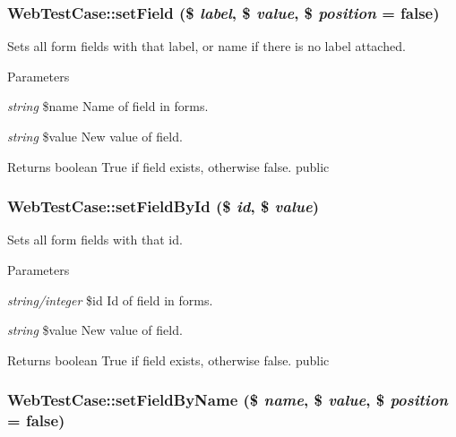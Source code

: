 \hypertarget{class_web_test_case_a2b8f21394a225f1386c22f671a6debc0}{
\subsubsection[{setField}]{\setlength{\rightskip}{0pt plus 5cm}WebTestCase::setField (\$ {\em label}, \/  \$ {\em value}, \/  \$ {\em position} = {\ttfamily false})}}
\label{class_web_test_case_a2b8f21394a225f1386c22f671a6debc0}
Sets all form fields with that label, or name if there is no label attached. 
\begin{DoxyParams}{Parameters}
\item[{\em string}]\$name Name of field in forms. \item[{\em string}]\$value New value of field. \end{DoxyParams}
\begin{DoxyReturn}{Returns}
boolean True if field exists, otherwise false.  public 
\end{DoxyReturn}
\hypertarget{class_web_test_case_a677f77692fd67768ad837a258a7ef4fd}{
\subsubsection[{setFieldById}]{\setlength{\rightskip}{0pt plus 5cm}WebTestCase::setFieldById (\$ {\em id}, \/  \$ {\em value})}}
\label{class_web_test_case_a677f77692fd67768ad837a258a7ef4fd}
Sets all form fields with that id. 
\begin{DoxyParams}{Parameters}
\item[{\em string/integer}]\$id Id of field in forms. \item[{\em string}]\$value New value of field. \end{DoxyParams}
\begin{DoxyReturn}{Returns}
boolean True if field exists, otherwise false.  public 
\end{DoxyReturn}
\hypertarget{class_web_test_case_ab3d6b5e72b290f14f51148642f1681e4}{
\subsubsection[{setFieldByName}]{\setlength{\rightskip}{0pt plus 5cm}WebTestCase::setFieldByName (\$ {\em name}, \/  \$ {\em value}, \/  \$ {\em position} = {\ttfamily false})}}
